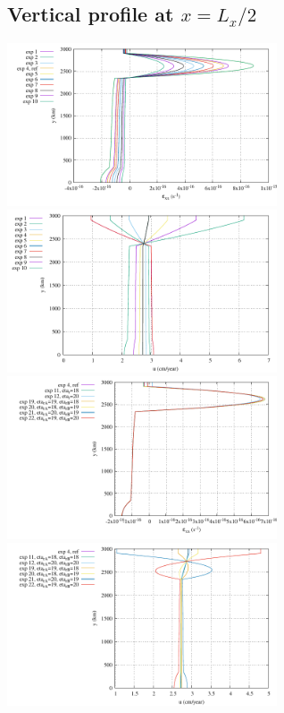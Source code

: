 \subsection*{Vertical profile at $x=L_x/2$}

\begin{center}
\includegraphics[width=8cm]{python_codes/fieldstone_148/results/fig1_exx_middle}
\includegraphics[width=8cm]{python_codes/fieldstone_148/results/fig1_u_middle}\\
\includegraphics[width=8cm]{python_codes/fieldstone_148/results/fig2_exx_middle}
\includegraphics[width=8cm]{python_codes/fieldstone_148/results/fig2_u_middle}\\

\end{center}
